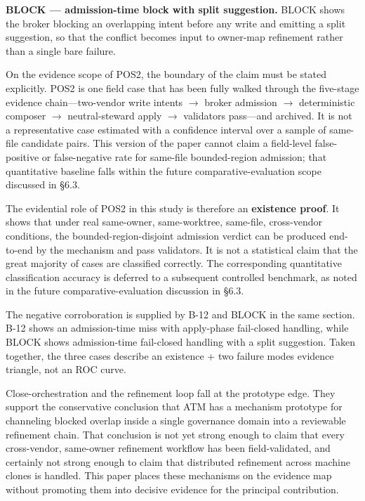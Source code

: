 \documentclass[9pt,letterpaper]{extarticle}
\begin{document}
\textbf{BLOCK --- admission-time block with split suggestion.} BLOCK shows the broker blocking an overlapping intent before any write and emitting a split suggestion, so that the conflict becomes input to owner-map refinement rather than a single bare failure.

On the evidence scope of POS2, the boundary of the claim must be stated explicitly. POS2 is one field case that has been fully walked through the five-stage evidence chain---two-vendor write intents $\rightarrow$ broker admission $\rightarrow$ deterministic composer $\rightarrow$ neutral-steward apply $\rightarrow$ validators pass---and archived. It is not a representative case estimated with a confidence interval over a sample of same-file candidate pairs. This version of the paper cannot claim a field-level false-positive or false-negative rate for same-file bounded-region admission; that quantitative baseline falls within the future comparative-evaluation scope discussed in §6.3.

The evidential role of POS2 in this study is therefore an \textbf{existence proof}. It shows that under real same-owner, same-worktree, same-file, cross-vendor conditions, the bounded-region-disjoint admission verdict can be produced end-to-end by the mechanism and pass validators. It is not a statistical claim that {}the great majority of cases are classified correctly{}. The corresponding quantitative classification accuracy is deferred to a subsequent controlled benchmark, as noted in the future comparative-evaluation discussion in §6.3.

The negative corroboration is supplied by B-12 and BLOCK in the same section. B-12 shows an admission-time miss with apply-phase fail-closed handling, while BLOCK shows admission-time fail-closed handling with a split suggestion. Taken together, the three cases describe an {}existence + two failure modes{} evidence triangle, not an ROC curve.

Close-orchestration and the refinement loop fall at the prototype edge. They support the conservative conclusion that ATM has a mechanism prototype for channeling blocked overlap inside a single governance domain into a reviewable refinement chain. That conclusion is not yet strong enough to claim that every cross-vendor, same-owner refinement workflow has been field-validated, and certainly not strong enough to claim that distributed refinement across machine clones is handled. This paper places these mechanisms on the evidence map without promoting them into decisive evidence for the principal contribution.
\end{document}
